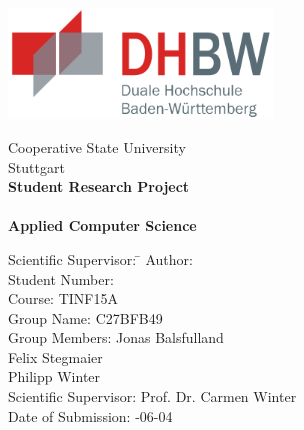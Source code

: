 \begin{titlepage}

\begin{minipage}{\textwidth}
		\vspace{-2cm}
		\centering \includegraphics[width=7cm, keepaspectratio]{img/dhbw_logo.png}
		\vspace{1cm}
\end{minipage}

\vspace{1em}

\sffamily
\begin{center}
	\textsf{\large{}Cooperative State University\\[1.5mm] Stuttgart}\\[2em] 
	\vspace{1cm}
	\textsf{\textbf{\Large{}Student Research Project}}\\ 
	\vspace{1cm}
	\textsf{\textbf{\dertitel}} \\[2em]	
	\vspace{1cm}
	\textsf{\textbf{\Large{}Applied Computer Science}}\\
	\vspace{2cm}
\vfill

\begin{minipage}{\textwidth}

\begin{tabbing}
	Scientific Supervisor: \hspace{1.85cm}\=\kill
	Author: \> \derautor \\[1.5mm]
	Student Number: \\[1.5mm]
	Course: \> TINF15A\\[1.5mm]
	Group Name: \> C27BFB49\\[1.5mm]
	Group Members: \> Jonas Balsfulland\\
	\> Felix Stegmaier\\
	\> Philipp Winter\\[1.5mm]
	Scientific Supervisor: \> Prof. Dr. Carmen Winter \\[1.5mm]
	Date of Submission: -06-04\\
\end{tabbing}
\end{minipage}

\end{center}

\end{titlepage}
